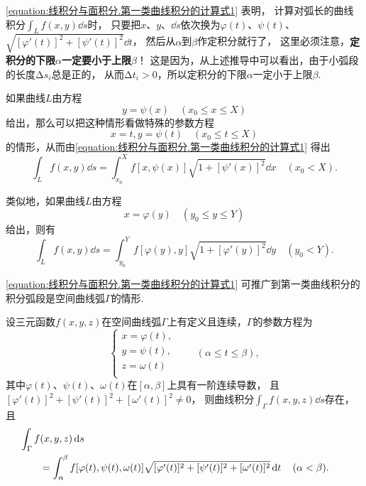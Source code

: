 \cref{equation:线积分与面积分.第一类曲线积分的计算式1} 表明，%
计算对弧长的曲线积分\(\int_L f(x,y) \dd{s}\)时，%
只要把\(x\)、\(y\)、\(\dd{s}\)依次换为\(\varphi(t)\)、\(\psi(t)\)、\(\sqrt{[\varphi'(t)]^2+[\psi'(t)]^2} \dd{t}\)，%
然后从\(\alpha\)到\(\beta\)作定积分就行了，%
这里必须注意，\textbf{定积分的下限\(\alpha\)一定要小于上限\(\beta\)}！
这是因为，从上述推导中可以看出，由于小弧段的长度\(\increment s_i\)总是正的，%
从而\(\increment t_i > 0\)，所以定积分的下限\(\alpha\)一定小于上限\(\beta\).

如果曲线\(L\)由方程\[
y = \psi(x)
\quad(x_0 \leqslant x \leqslant X)
\]给出，那么可以把这种情形看做特殊的参数方程\[
x = t,
y = \psi(t)
\quad(x_0 \leqslant t \leqslant X)
\]的情形，从而由\cref{equation:线积分与面积分.第一类曲线积分的计算式1} 得出
\begin{equation}
\int_L f(x,y) \dd{s}
= \int_{x_0}^X f[x,\psi(x)] \sqrt{1+[\psi'(x)]^2} \dd{x}
\quad(x_0 < X).
\end{equation}

类似地，如果曲线\(L\)由方程\[
x = \varphi(y)
\quad(y_0 \leqslant y \leqslant Y)
\]给出，则有
\begin{equation}
\int_L f(x,y) \dd{s}
= \int_{y_0}^Y f[\varphi(y),y] \sqrt{1+[\varphi'(y)]^2} \dd{y}
\quad(y_0 < Y).
\end{equation}

\cref{equation:线积分与面积分.第一类曲线积分的计算式1} 可推广到第一类曲线积分的积分弧段是空间曲线弧\(\Gamma\)的情形.
\begin{theorem}
设三元函数\(f(x,y,z)\)在空间曲线弧\(\Gamma\)上有定义且连续，\(\Gamma\)的参数方程为\[
\left\{ \begin{array}{l}
x = \varphi(t), \\
y = \psi(t), \\
z = \omega(t) \\
\end{array} \right.
\qquad
(\alpha \leqslant t \leqslant \beta),
\]其中\(\varphi(t)\)、\(\psi(t)\)、\(\omega(t)\)在\([\alpha,\beta]\)上具有一阶连续导数，%
且\([\varphi'(t)]^2+[\psi'(t)]^2+[\omega'(t)]^2 \neq 0\)，%
则曲线积分\(\int_{\Gamma} f(x,y,z) \dd{s}\)存在，%
且\begin{equation}\label{equation:线积分与面积分.第一类曲线积分的计算式2}
\begin{aligned}
&\hspace{-20pt}
\int_{\Gamma} f(x,y,z) \dd{s} \\
&= \int_{\alpha}^{\beta} f[\varphi(t),\psi(t),\omega(t)] \sqrt{[\varphi'(t)]^2+[\psi'(t)]^2+[\omega'(t)]^2} \dd{t}
\quad(\alpha<\beta).
\end{aligned}
\end{equation}
\end{theorem}

